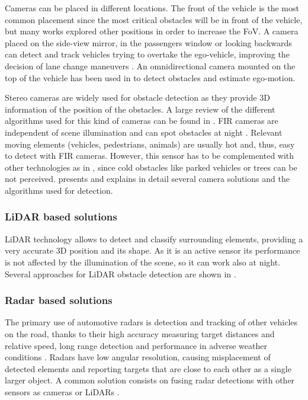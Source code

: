 \documentclass[journal]{IEEEtran}
\begin{document}
Cameras can be placed in different locations. The front of the vehicle is 
the most common placement since the most critical obstacles will be in front of 
the vehicle, but many works explored other positions in order to increase the
FoV. 
A camera placed on the side-view mirror, in the 
passengers window \cite{chang2008real} or looking backwards \cite{liu2007rear}
can detect and track vehicles trying to overtake the ego-vehicle, 
improving the decision of lane change maneuvers \cite{alonso2008lane, 
	song2007lateral, blanc2007larasidecam}. 
An omnidirectional camera mounted
on the top of the vehicle has been used in \cite{gandhi2006vehicle}
to detect obstacles and estimate ego-motion.

Stereo cameras are widely used for obstacle detection as they provide 3D 
information of the position of the obstacles. A large review of the different 
algorithms used for this kind of cameras can be found in \cite{bernini2014real}.
FIR cameras are independent of scene illumination and can spot obstacles at
night \cite{olmeda2013pedestrian}. Relevant moving elements (vehicles, 
pedestrians, animals) are usually hot and, thus, easy to detect with FIR 
cameras. However, this sensor has to be complemented with other technologies
as in \cite{krotosky2007color}, since cold obstacles like parked vehicles or
trees can be not perceived.
\cite{sivaraman2013looking} presents and explains in detail several camera
solutions and the algorithms used for detection.

\subsubsection{LiDAR based solutions}
LiDAR technology allows to detect and classify surrounding elements, providing
a very accurate 3D position and its shape. 
As it is an active sensor its performance is not affected by the illumination 
of the scene, so it can work also at night. Several approaches for LiDAR 
obstacle detection are shown in \cite{li2016vehicle}.

\subsubsection{Radar based solutions}
The primary use of automotive radars is detection and tracking of other 
vehicles on the road, thanks to their high accuracy measuring target 
distances and relative speed, long range detection and performance in adverse 
weather conditions \cite{blanc2004obstacle}. 
Radars have low angular resolution, causing misplacement of detected elements 
and reporting targets that are close to each other as a single larger object.
A common solution consists on fusing radar detections with other sensors as 
cameras \cite{garcia2012data} or LiDARs \cite{gohring2011radar}.
\end{document}
